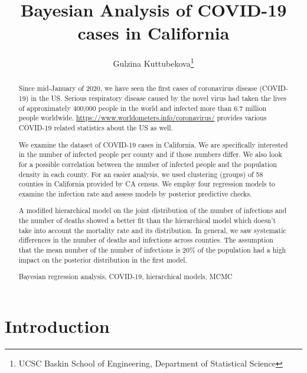 \documentclass[11pt,twocolumn]{asaproc}
\title{Bayesian Analysis of COVID-19 cases in California}
\author{Gulzina Kuttubekova\thanks{UCSC Baskin School of Engineering, Department of Statistical Science}}
\begin{document}
\maketitle





\begin{abstract} 
 Since mid-January of 2020, we have seen the first cases of coronavirus disease (COVID-19) in the US. Serious respiratory disease caused by the novel virus had taken the lives of approximately 400,000 people in the world and infected more than 6.7 million people worldwide. \url{https://www.worldometers.info/coronavirus/} provides various COVID-19 related statistics about the US as well.

We examine the dataset of COVID-19 cases in California. We are specifically interested in the number of infected people per county and if those numbers differ. We also look for a possible correlation between the number of infected people and the population density in each county. For an easier analysis, we used clustering (groups) of 58 counties in California provided by CA census. We employ four regression models to examine the infection rate and assess models by posterior predictive checks. 

A modified hierarchical model on the joint distribution of the number of infections and the number of deaths showed a better fit than the hierarchical model which doesn't take into account the mortality rate and its distribution. In general, we saw systematic differences in the number of deaths and infections across counties. The assumption that the mean number of the number of infections is 20\% of the population had a high impact on the posterior distribution in the first model.


\begin{keywords}
Bayesian regression analysis, COVID-19, hierarchical models, MCMC
\end{keywords}
\end{abstract}







\section{Introduction\label{Introduction}}
\end{document}
